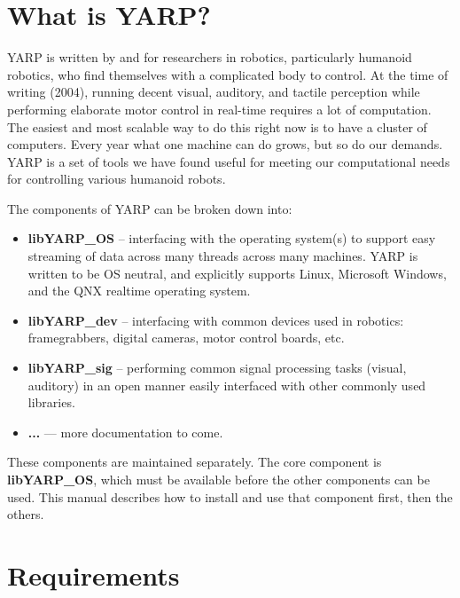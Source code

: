 
\section{What is YARP?}

YARP is written by and for researchers in robotics, particularly
humanoid robotics, who find themselves with a complicated body to
control.  At the time of writing (2004), running decent visual,
auditory, and tactile perception while performing elaborate motor
control in real-time requires a lot of computation.  The easiest and
most scalable way to do this right now is to have a cluster of 
computers.  Every year what one machine can do grows, but so do
our demands.  YARP is a set of tools we have found useful for 
meeting our computational needs for controlling various humanoid robots.

The components of YARP can be broken down into:

\begin{itemize}

\item {\bf libYARP\_OS} -- interfacing with the operating system(s)
to support easy streaming of data across many threads across many
machines.  YARP is written to be OS neutral, and explicitly supports
Linux, Microsoft Windows, and the QNX realtime operating system.

\item {\bf libYARP\_dev} -- interfacing with common devices used in robotics:
framegrabbers, digital cameras, motor control boards, etc.

\item {\bf libYARP\_sig} -- performing common signal processing tasks
(visual, auditory) in an open manner easily interfaced with other
commonly used libraries.

\item {\bf ...} --- more documentation to come.

\end{itemize}

These components are maintained separately.  The core component
is {\bf libYARP\_OS}, which must be available before the other 
components can be used.  This manual describes how to install and
use that component first, then the others.



\section{Requirements}

